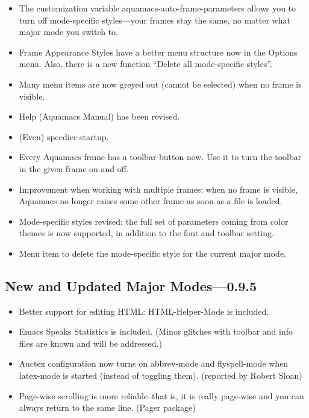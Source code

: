 \begin{itemize}
\item The customization variable aquamacs-auto-frame-parameters allows you to
	turn off mode-specific styles---your frames stay the same, no
	matter what major mode you switch to. 
 
\item Frame Appearance Styles have a better menu structure now in the Options
	menu. Also, there is a new function ``Delete all mode-specific
	styles''. 

\item Many menu items are now greyed out (cannot be selected) when no frame is visible.

\item Help (Aquamacs Manual) has been revised.


	
\item (Even) speedier startup.



\item Every Aquamacs frame has a toolbar-button now. Use it to turn the
	toolbar in the given frame on and off. 
	

	
\item Improvement when working with multiple frames: when no frame is visible,
	Aquamacs no longer raises some other frame as soon as a file is
	loaded.	



\item Mode-specific styles revised: the full set of parameters coming from 
	color themes is now supported, in addition to the font and toolbar setting.

\item Menu item to delete the mode-specific style for the current major mode.


\end{itemize}



\subsection{New and Updated Major Modes---0.9.5}
\begin{itemize}

\item Better support for editing HTML: HTML-Helper-Mode is included.

\item Emacs Speaks Statistics is included. (Minor glitches with toolbar and  info
    files are known and will be addressed.)

\item Auctex configuration now turns on abbrev-mode and flyspell-mode when
    latex-mode is started (instead of toggling them).
    (reported by Robert Sloan)

\item Page-wise scrolling is more reliable--that is, it is really page-wise and
    you can always return to the same line. (Pager package)
\end{itemize}


